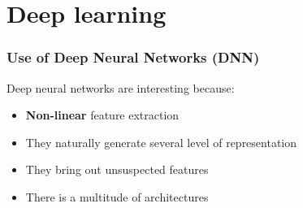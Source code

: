 \documentclass[11pt,english]{beamer}
\begin{document}
\section{Deep learning}

\begin{frame}
  \frametitle{Use of Deep Neural Networks (DNN)}

Deep neural networks are interesting because:
\begin{itemize}
\item \textbf{Non-linear} feature extraction
\item<2-> They naturally generate several level of representation
\item<3-> They bring out unsuspected features
\item<4-> There is a multitude of architectures


\end{itemize}

\end{frame}
\end{document}
